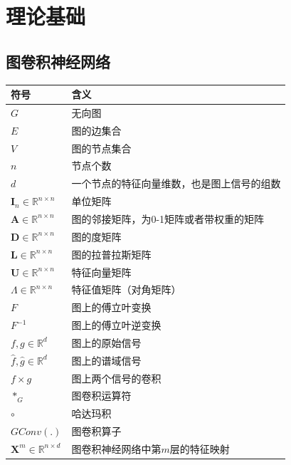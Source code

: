 \chapter{理论基础} \label{chpt:B}
  \section{图卷积神经网络} \label{sec:B1}
  \begin{center}
    \begin{tabular}{ll}
      \toprule
      符号 & 含义\\ 
      \midrule
      $G$ & 无向图 \\
      $E$ & 图的边集合 \\
      $V$ & 图的节点集合 \\
      $n$ & 节点个数 \\
      $d$ & 一个节点的特征向量维数，也是图上信号的组数 \\
      $\mathbf{I}_n\in \mathbb{R}^{n \times n}$ & 单位矩阵 \\
      $\mathbf{A} \in \mathbb{R}^{n \times n}$ & 图的邻接矩阵，为0-1矩阵或者带权重的矩阵 \\
      $\mathbf{D}\in \mathbb{R}^{n \times n}$ & 图的度矩阵 \\
      $\mathbf{L}\in \mathbb{R}^{n \times n}$ & 图的拉普拉斯矩阵 \\
      $\mathbf{U}\in \mathbb{R}^{n \times n}$ & 特征向量矩阵 \\
      $\Lambda\in \mathbb{R}^{n \times n}$ & 特征值矩阵（对角矩阵）\\
      $F$ & 图上的傅立叶变换 \\
      $F^{-1}$ & 图上的傅立叶逆变换 \\
      $f,g \in \mathbb{R}^{d}$ & 图上的原始信号 \\
      $\hat{f}, \hat{g}\in \mathbb{R}^{d}$ & 图上的谱域信号 \\
      $f \times g$ & 图上两个信号的卷积 \\
      $*_{G}$ & 图卷积运算符 \\
      $\circ$ & 哈达玛积 \\
      $GConv(.)$ & 图卷积算子 \\
      $\mathbf{X}^{m}\in \mathbb{R}^{n \times d}$ & 图卷积神经网络中第$m$层的特征映射 \\
      \bottomrule
    \end{tabular}
  \end{center}

